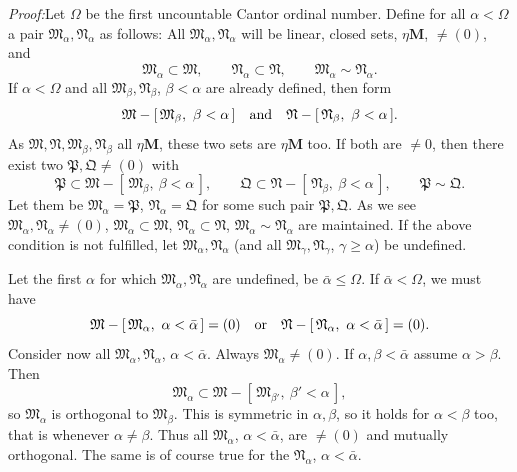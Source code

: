 \documentclass[12pt,b5paper,twoside]{article}
\newcommand{\M}{\mathbf M}
\newcommand{\clos}[1]{[\,#1\,]}
\newcommand{\Proof}{\par\noindent\textit{Proof:}\enspace}
\begin{document}
\Proof Let \(\Omega\) be the first uncountable Cantor ordinal number. Define
for all \(\alpha<\Omega\) a pair \(\mathfrak M_\alpha,\mathfrak N_\alpha\)
as follows: All \(\mathfrak M_\alpha,\mathfrak N_\alpha\) will be linear,
closed sets, \(\mathbin{\eta}\M\), \(\ne(0)\), and
\[
 \mathfrak M_\alpha\subset\mathfrak M,\qquad
 \mathfrak N_\alpha\subset\mathfrak N,\qquad
 \mathfrak M_\alpha\sim\mathfrak N_\alpha.
\]
If \(\alpha<\Omega\) and all \(\mathfrak M_\beta,\mathfrak N_\beta\),
\(\beta<\alpha\) are already defined, then form
\[
 \mathfrak M-\clos{\mathfrak M_\beta,\ \beta<\alpha}
 \quad\hbox{and}\quad
 \mathfrak N-\clos{\mathfrak N_\beta,\ \beta<\alpha}.
\]
As \(\mathfrak M,\mathfrak N,\mathfrak M_\beta,\mathfrak N_\beta\) all
\(\mathbin{\eta}\M\), these two sets are \(\mathbin{\eta}\M\) too. If
both are \(\ne0\), then there exist two \(\mathfrak P,\mathfrak Q\ne(0)\)
with
\[
 \mathfrak P\subset
   \mathfrak M-\clos{\mathfrak M_\beta,\ \beta<\alpha},
 \qquad
 \mathfrak Q\subset
   \mathfrak N-\clos{\mathfrak N_\beta,\ \beta<\alpha},
 \qquad
 \mathfrak P\sim\mathfrak Q.
\]
Let them be \(\mathfrak M_\alpha=\mathfrak P\),
\(\mathfrak N_\alpha=\mathfrak Q\) for some such pair
\(\mathfrak P,\mathfrak Q\). As we see
\(\mathfrak M_\alpha,\mathfrak N_\alpha\ne(0)\),
\(\mathfrak M_\alpha\subset\mathfrak M\),
\(\mathfrak N_\alpha\subset\mathfrak N\),
\(\mathfrak M_\alpha\sim\mathfrak N_\alpha\) are maintained. If the above
condition is not fulfilled, let \(\mathfrak M_\alpha,\mathfrak N_\alpha\)
(and all \(\mathfrak M_\gamma,\mathfrak N_\gamma\),
\(\gamma\geq\alpha\)) be undefined.

Let the first \(\alpha\) for which \(\mathfrak M_\alpha,\mathfrak N_\alpha\)
are undefined, be \(\bar\alpha\leq\Omega\). If
\(\bar\alpha<\Omega\), we must have
\[
 \mathfrak M-\clos{\mathfrak M_\alpha,\ \alpha<\bar\alpha}=(0)
 \quad\hbox{or}\quad
 \mathfrak N-\clos{\mathfrak N_\alpha,\ \alpha<\bar\alpha}=(0).
\]
Consider now all \(\mathfrak M_\alpha,\mathfrak N_\alpha\),
\(\alpha<\bar\alpha\). Always \(\mathfrak M_\alpha\ne(0)\). If
\(\alpha,\beta<\bar\alpha\) assume \(\alpha>\beta\). Then
\[
 \mathfrak M_\alpha\subset
 \mathfrak M-\clos{\mathfrak M_{\beta'},\ \beta'<\alpha},
\]
so \(\mathfrak M_\alpha\) is orthogonal to \(\mathfrak M_\beta\). This is
symmetric in \(\alpha,\beta\), so it holds for \(\alpha<\beta\) too, that is
whenever \(\alpha\ne\beta\). Thus all \(\mathfrak M_\alpha\),
\(\alpha<\bar\alpha\), are \(\ne(0)\) and mutually orthogonal. The same is
of course true for the \(\mathfrak N_\alpha\),
\(\alpha<\bar\alpha\).
\end{document}
